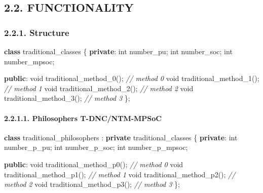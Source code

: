 \documentclass[
]{article}
\newenvironment{Shaded}{}{}
\newcommand{\CommentTok}[1]{\textcolor[rgb]{0.38,0.63,0.69}{\textit{#1}}}
\newcommand{\DataTypeTok}[1]{\textcolor[rgb]{0.56,0.13,0.00}{#1}}
\newcommand{\KeywordTok}[1]{\textcolor[rgb]{0.00,0.44,0.13}{\textbf{#1}}}
\newcommand{\NormalTok}[1]{#1}
\begin{document}
\hypertarget{functionality-1}{%
\subsection{2.2. FUNCTIONALITY}\label{functionality-1}}

\hypertarget{structure-1}{%
\subsubsection{2.2.1. Structure}\label{structure-1}}

\begin{Shaded}
\begin{Highlighting}[]
\KeywordTok{class}\NormalTok{ traditional\_classes \{}
   \KeywordTok{private}\NormalTok{:}
      \DataTypeTok{int}\NormalTok{ number\_pu;}
      \DataTypeTok{int}\NormalTok{ number\_soc;}
      \DataTypeTok{int}\NormalTok{ number\_mpsoc;}

   \KeywordTok{public}\NormalTok{:}
      \DataTypeTok{void}\NormalTok{ traditional\_method\_0();  }\CommentTok{// method 0}
      \DataTypeTok{void}\NormalTok{ traditional\_method\_1();  }\CommentTok{// method 1}
      \DataTypeTok{void}\NormalTok{ traditional\_method\_2();  }\CommentTok{// method 2}
      \DataTypeTok{void}\NormalTok{ traditional\_method\_3();  }\CommentTok{// method 3}
\NormalTok{\};}
\end{Highlighting}
\end{Shaded}

\hypertarget{philosophers-t-dncntm-mpsoc-1}{%
\paragraph{2.2.1.1. Philosophers
T-DNC/NTM-MPSoC}\label{philosophers-t-dncntm-mpsoc-1}}

\begin{Shaded}
\begin{Highlighting}[]
\KeywordTok{class}\NormalTok{ traditional\_philosophers : }\KeywordTok{private}\NormalTok{ traditional\_classes \{}
   \KeywordTok{private}\NormalTok{:}
      \DataTypeTok{int}\NormalTok{ number\_p\_pu;}
      \DataTypeTok{int}\NormalTok{ number\_p\_soc;}
      \DataTypeTok{int}\NormalTok{ number\_p\_mpsoc;}

   \KeywordTok{public}\NormalTok{:}
      \DataTypeTok{void}\NormalTok{ traditional\_method\_p0();  }\CommentTok{// method 0}
      \DataTypeTok{void}\NormalTok{ traditional\_method\_p1();  }\CommentTok{// method 1}
      \DataTypeTok{void}\NormalTok{ traditional\_method\_p2();  }\CommentTok{// method 2}
      \DataTypeTok{void}\NormalTok{ traditional\_method\_p3();  }\CommentTok{// method 3}
\NormalTok{\};}
\end{Highlighting}
\end{Shaded}
\end{document}
